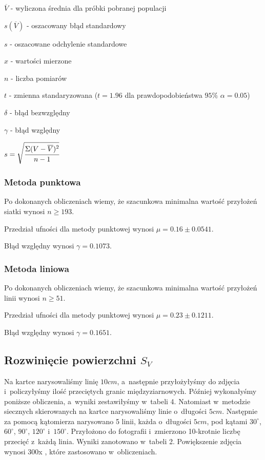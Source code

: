 \documentclass[a4paper,12pt]{article}
\begin{document}
$\overline{V}$ - wyliczona średnia dla próbki pobranej populacji

$s(\overline{V})$ - oszacowany błąd standardowy

$s$ - oszacowane odchylenie standardowe

$x$ - wartości mierzone 

$n$ - liczba pomiarów

$t$ - zmienna standaryzowana ($t=1.96$ dla prawdopodobieństwa $95\%$ $\alpha=0.05$)

$\delta$ - błąd bezwzględny

$\gamma$ - błąd względny

$s=\sqrt{\cfrac{\Sigma (V-\overline{V})^2}{n-1}}$
\newpage

\subsubsection{Metoda punktowa}

Po dokonanych obliczeniach wiemy, że szacunkowa minimalna wartość przyłożeń siatki wynosi $n\ge 193$.



Przedział ufności dla metody punktowej wynosi $\mu=0.16\pm 0.0541$.

Błąd względny wynosi $\gamma=0.1073$.
\newpage

\subsubsection{Metoda liniowa}

Po dokonanych obliczeniach wiemy, że szacunkowa minimalna wartość przyłożeń linii wynosi $n\ge 51$.



Przedział ufności dla metody punktowej wynosi $\mu=0.23\pm 0.1211$.

Błąd względny wynosi $\gamma=0.1651$.
\newpage

\subsection{Rozwinięcie powierzchni $S_V$}

Na kartce narysowaliśmy linię $10cm$, a~następnie przyłożyłyśmy do zdjęcia i~policzyłyśmy ilość przeciętych granic międzyziarnowych. Później wykonałyśmy poniższe obliczenia, a~wyniki zestawiłyśmy w~tabeli 4.  Natomiast w~metodzie siecznych skierowanych na kartce narysowaliśmy linie o~długości $5cm$. Następnie za pomocą kątomierza narysowano 5 linii, każda o~długości $5cm$, pod kątami $30^\circ$, $60^\circ$, $90^\circ$, $120^\circ$ i~$150^\circ$. Przyłożono do fotografii i~zmierzono 10-krotnie liczbę przecięć z~każdą linia. Wyniki zanotowano w~tabeli 2.
Powiększenie zdjęcia  wynosi 300x , które zastosowano w~obliczeniach.
\newline
\end{document}
